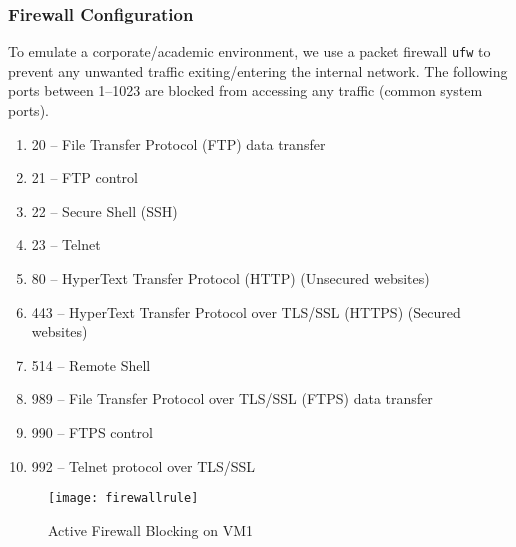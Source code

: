 \documentclass[a4paper,12pt]{article}
\begin{document}
	\subsubsection{Firewall Configuration}
	To emulate a corporate/academic environment, we use a packet firewall \texttt{ufw} to prevent any unwanted traffic exiting/entering the internal network. The following ports between 1--1023 are blocked from accessing any traffic (common system ports).
	\begin{enumerate}
		\itemsep0em 
		\item 20 -- File Transfer Protocol (FTP) data transfer
		\item 21 -- FTP control
		\item 22 -- Secure Shell (SSH)
		\item 23 -- Telnet
		\item 80 -- HyperText Transfer Protocol (HTTP) (Unsecured websites)
		\item 443 -- HyperText Transfer Protocol over TLS/SSL (HTTPS) (Secured websites)
		\item 514 -- Remote Shell
		\item 989 -- File Transfer Protocol over TLS/SSL (FTPS) data transfer
		\item 990 -- FTPS control
		\item 992 -- Telnet protocol over TLS/SSL
	\end{enumerate}
	\begin{figure}[H]
		\centering
		\texttt{[image: firewallrule]}
		\caption{Active Firewall Blocking on VM1}
		\label{fig:firewallrule}
	\end{figure}
	\fi
	
\end{document}
